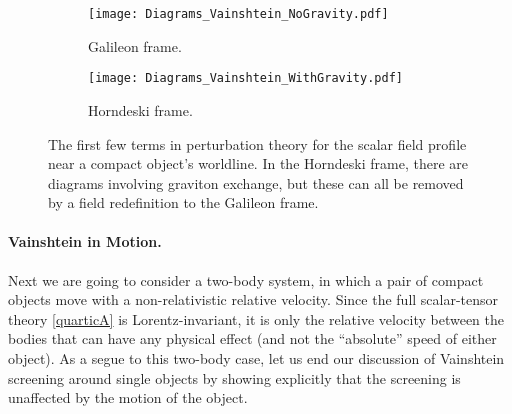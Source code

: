 \documentclass[11pt]{article}
\begin{document}
\begin{figure}[htbp!]
     \begin{subfigure}[b]{\textwidth}
\texttt{[image: Diagrams\_Vainshtein\_NoGravity.pdf]}
         \caption{Galileon frame.}
     \end{subfigure}
     \hfill
     \begin{subfigure}[b]{\textwidth}
         \centering
\texttt{[image: Diagrams\_Vainshtein\_WithGravity.pdf]}
         \caption{Horndeski frame.}
     \end{subfigure}
\caption{
The first few terms in perturbation theory for the scalar field profile near a compact object's worldline. In the Horndeski frame, there are diagrams involving graviton exchange, but these can all be removed by a field redefinition to the Galileon frame. 
}
\label{fig:Vainshtein}
\end{figure}


\paragraph{Vainshtein in Motion.}
Next we are going to consider a two-body system, in which a pair of compact objects move with a non-relativistic relative velocity. Since the full scalar-tensor theory \eqref{quarticA} is Lorentz-invariant, it is only the relative velocity between the bodies that can have any physical effect (and not the ``absolute'' speed of either object).  
As a segue to this two-body case, let us end our discussion of Vainshtein screening around single objects by showing explicitly that the screening is unaffected by the motion of the object. 
\end{document}
